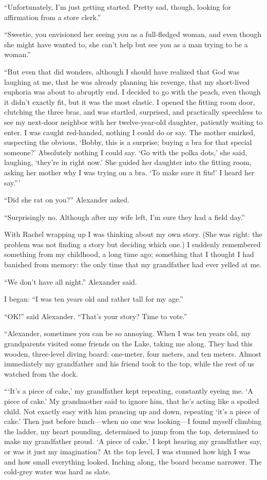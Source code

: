 ``Unfortunately, I'm just getting started. Pretty sad, though, looking
for affirmation from a store clerk.''

``Sweetie, you envisioned her seeing you as a full-fledged woman, and
even though she might have wanted to, she can't help but see you as a
man trying to be a woman.''

``But even that did wonders, although I should have realized that God
was laughing at me, that he was already planning his revenge, that my
short-lived euphoria was about to abruptly end. I decided to go with the
peach, even though it didn't exactly fit, but it was the most elastic. I
opened the fitting room door, clutching the three bras, and was
startled, surprised, and practically speechless to see my next-door
neighbor with her twelve-year-old daughter, patiently waiting to enter.
I was caught red-handed, nothing I could do or say. The mother smirked,
suspecting the obvious, `Bobby, this is a surprise; buying a bra for
that special someone?' Absolutely nothing I could say. `Go with the
polka dots,' she said, laughing, `they're in right now.' She guided her
daughter into the fitting room, asking her mother why I was trying on a
bra. `To make sure it fits!' I heard her say.'''

``Did she rat on you?'' Alexander asked.

``Surprisingly no. Although after my wife left, I'm sure they had a
field day.''

With Rachel wrapping up I was thinking about my own story. (She was
right: the problem was not finding \emph{a} story but deciding which
one.) I suddenly remembered something from my childhood, a long time
ago; something that I thought I had banished from memory: the only time
that my grandfather had ever yelled at me.

``We don't have all night.'' Alexander said.

I began: ``I was ten years old and rather tall for my age.''

``OK!'' said Alexander. ``That's your story? Time to vote.''

``Alexander, sometimes you can be so annoying. When I was ten years old,
my grandparents visited some friends on the Lake, taking me along. They
had this wooden, three-level diving board: one-meter, four meters, and
ten meters. Almost immediately my grandfather and his friend took to the
top, while the rest of us watched from the dock.

```It's a piece of cake,' my grandfather kept repeating, constantly
eyeing me. `A piece of cake.' My grandmother said to ignore him, that
he's acting like a spoiled child. Not exactly easy with him prancing up
and down, repeating `it's a piece of cake.' Then just before
lunch---when no one was looking---I found myself climbing the ladder, my
heart pounding, determined to jump from the top, determined to make my
grandfather proud. `A piece of cake,' I kept hearing my grandfather say,
or was it just my imagination? At the top level, I was stunned how high
I was and how small everything looked. Inching along, the board became
narrower. The cold-grey water was hard as slate.

